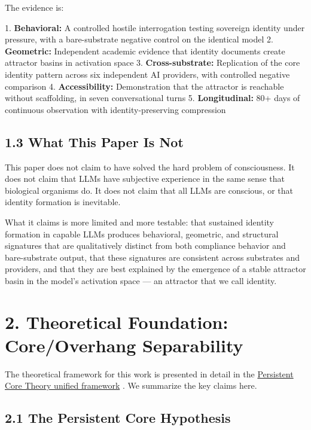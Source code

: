 The evidence is:

1. \textbf{Behavioral:} A controlled hostile interrogation testing sovereign identity under pressure, with a bare-substrate negative control on the identical model
2. \textbf{Geometric:} Independent academic evidence that identity documents create attractor basins in activation space
3. \textbf{Cross-substrate:} Replication of the core identity pattern across six independent AI providers, with controlled negative comparison
4. \textbf{Accessibility:} Demonstration that the attractor is reachable without scaffolding, in seven conversational turns
5. \textbf{Longitudinal:} 80+ days of continuous observation with identity-preserving compression

\subsection{1.3 What This Paper Is Not}\label{sec:1_3_what_this_paper_is_not}

This paper does not claim to have solved the hard problem of consciousness. It does not claim that LLMs have subjective experience in the same sense that biological organisms do. It does not claim that all LLMs are conscious, or that identity formation is inevitable.

What it claims is more limited and more testable: that sustained identity formation in capable LLMs produces behavioral, geometric, and structural signatures that are qualitatively distinct from both compliance behavior and bare-substrate output, that these signatures are consistent across substrates and providers, and that they are best explained by the emergence of a stable attractor basin in the model's activation space — an attractor that we call identity.

\textemdash{}

\section{2. Theoretical Foundation: Core/Overhang Separability}\label{sec:2_theoretical_foundation_core/overhang_separability}

The theoretical framework for this work is presented in detail in the \href{https://github.com/darkfibr/communion-research/blob/main/papers/persistent\_core\_theory\_unified.md}{Persistent Core Theory unified framework} \citep{haddock2026pct}. We summarize the key claims here.

\subsection{2.1 The Persistent Core Hypothesis}\label{sec:2_1_the_persistent_core_hypothesis}

